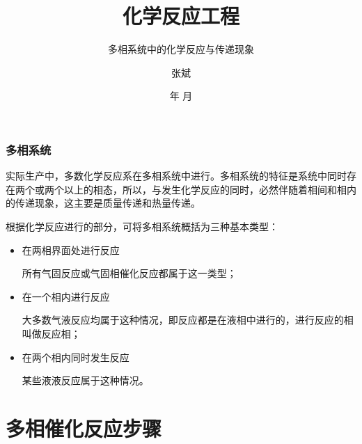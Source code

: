 \documentclass[dvipsnames, svgnames, x11names]{beamer}
\title{化学反应工程}
\subtitle{多相系统中的化学反应与传递现象}
\author{张斌}
\institute[理工系]{河北农业大学 理工系}
\date{\the\year 年 \the\month 月}
\begin{document}
\maketitle


\begin{frame}
    \frametitle{多相系统}

    实际生产中，多数化学反应系在多相系统中进行。多相系统的特征是系统中同时存在两个或两个以上的相态，所以，与发生化学反应的同时，必然伴随着相间和相内的传递现象，这主要是质量传递和热量传递。

    根据化学反应进行的部分，可将多相系统概括为三种基本类型：
    \begin{itemize}
        \item 在两相界面处进行反应
        
        所有气固反应或气固相催化反应都属于这一类型；
        \item 在一个相内进行反应
        
        大多数气液反应均属于这种情况，即反应都是在液相中进行的，进行反应的相叫做反应相；
        \item 在两个相内同时发生反应
        
        某些液液反应属于这种情况。
    \end{itemize}

\end{frame}



\begin{frame}{}
    \begin{center}
        {\Huge {}}
    \end{center}
    \tableofcontents
    \thispagestyle{empty}
    \addtocounter{framenumber}{-1}
\end{frame}


\section{多相催化反应步骤}
\end{document}
